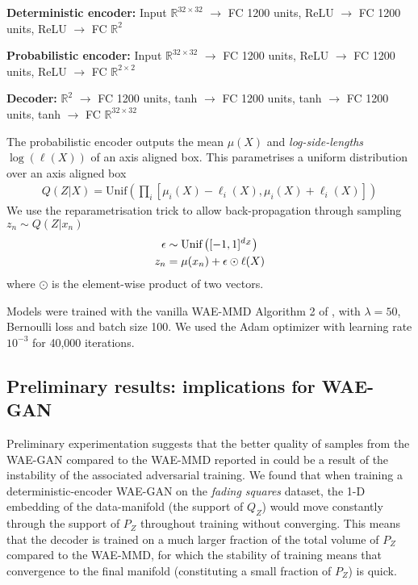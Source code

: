 \textbf{Deterministic encoder:} Input $\mathbb{R}^{32 \times 32}$ $\rightarrow$ FC 1200 units, ReLU $\rightarrow$ FC 1200 units, ReLU $\rightarrow$ FC $\mathbb{R}^2$

\textbf{Probabilistic encoder:} Input $\mathbb{R}^{32 \times 32}$ $\rightarrow$ FC 1200 units, ReLU $\rightarrow$ FC 1200 units, ReLU $\rightarrow$ FC $\mathbb{R}^{2\times 2}$

\textbf{Decoder:} $\mathbb{R}^{2}$ $\rightarrow$ FC 1200 units, tanh $\rightarrow$ FC 1200 units, tanh $\rightarrow$  FC 1200 units, tanh $\rightarrow$  FC $\mathbb{R}^{32\times 32}$

The probabilistic encoder outputs the mean $\mu(X)$ and \emph{log-side-lengths} $\log(\ell(X))$ of an axis aligned box. This parametrises a uniform distribution over an axis aligned box 
%
\begin{align*}
Q(Z|X) = \text{Unif}\left(\prod_{i} [\mu_i(X) - \ell_i(X), \mu_i(X) + \ell_i(X)]\right)
\end{align*}
%
We use the reparametrisation trick to allow back-propagation through sampling $z_n \sim Q(Z| x_n)$
%
\begin{align*}
	\epsilon &\sim \text{Unif}\left([-1, 1]^{d_{\mathcal{Z}}} \right) \\
	z_n &= \mu(x_n)  + \epsilon \odot \ell(X)
\end{align*}
%
where $\odot$ is the element-wise product of two vectors.

Models were trained with the vanilla WAE-MMD Algorithm 2 of \cite{TBG+17}, with $\lambda = 50$, Bernoulli loss and batch size 100. We used the Adam optimizer with learning rate $10^{-3}$ for 40,000 iterations.

\subsection{Preliminary results: implications for WAE-GAN}\label{appendix:wae_gan}

	Preliminary experimentation suggests that the better quality of samples from the {WAE-GAN} compared to the {WAE-MMD} reported in \cite{TBG+17} could be a result of the instability of the associated adversarial training. We found that when training a deterministic-encoder {WAE-GAN} on the \emph{fading squares} dataset, the {1-D} embedding of the data-manifold (the support of $Q_Z$) would move constantly through the support of $P_Z$ throughout training without converging. This means that the decoder is trained on a much larger fraction of the total volume of $P_Z$ compared to the {WAE-MMD}, for which the stability of training means that convergence to the final manifold (constituting a small fraction of $P_Z$) is quick.


